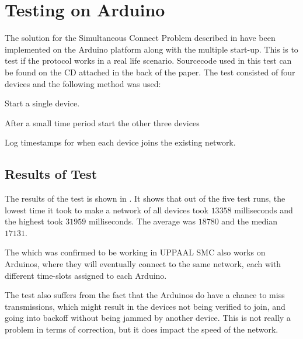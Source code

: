 \newpage
\section{Testing on Arduino}\label{sec:ccrc_test}
The solution for the Simultaneous Connect Problem described in  have been implemented on the Arduino platform along with the multiple start-up.
This is to test if the protocol works in a real life scenario. 
Sourcecode used in this test can be found on the CD attached in the back of the paper.
The test consisted of four devices and the following method was used:
\begin{eletterate}
	\item Start a single device.
	\item After a small time period start the other three devices
	\item Log timestamps for when each device joins the existing network.
\end{eletterate}

\subsection{Results of Test}
The results of the test is shown in .
It shows that out of the five test runs, the lowest time it took to make a network of all devices took $13 358$ milliseconds and the highest took $31 959$ milliseconds.
The average was $18780$ and the median $17131$.

The  which was confirmed to be working in UPPAAL SMC also works on Arduinos, where they will eventually connect to the same network, each with different time-slots assigned to each Arduino.

The test also suffers from the fact that the Arduinos do have a chance to miss transmissions, which might result in the devices not being verified to join, and going into backoff without being jammed by another device.
This is not really a problem in terms of correction, but it does impact the speed of the network.

